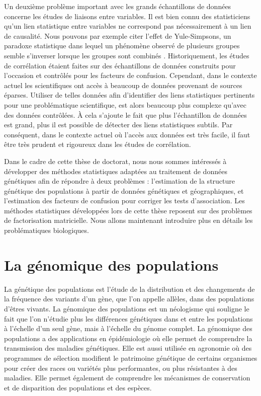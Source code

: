 \documentclass[12pt,a4paper,twoside]{ugathesis}
\begin{document}
Un deuxième problème important avec les grands échantillons de données concerne
les études de liaisons entre variables. Il est bien connu des statisticiens
qu'un lien statistique entre variables ne correspond pas nécessairement à un
lien de causalité. Nous pouvons par exemple citer l'effet de Yule-Simpsons, un
paradoxe statistique dans lequel un phénomène observé de plusieurs groupes
semble s'inverser lorsque les groupes sont combinés
\citep{simpson1951interpretation}. Historiquement, les études de corrélation
étaient faites sur des échantillons de données construits pour l'occasion et
contrôlés pour les facteurs de confusion. Cependant, dans le contexte actuel les
scientifiques ont accès à beaucoup de données provenant de sources éparses.
Utiliser de telles données afin d'identifier des liens statistiques pertinents
pour une problématique scientifique, est alors beaucoup plus complexe qu'avec
des données contrôlées. À cela s'ajoute le fait que plus l'échantillon de
données est grand, plus il est possible de détecter des liens statistiques
subtils. Par conséquent, dans le contexte actuel où l'accès aux données est très
facile, il faut être très prudent et rigoureux dans les études de corrélation.

Dans le cadre de cette thèse de doctorat, nous nous sommes intéressés à
développer des méthodes statistiques adaptées au traitement de données
génétiques afin de répondre à deux problèmes : l'estimation de la structure
génétique des populations à partir de données génétiques et géographiques, et
l'estimation des facteurs de confusion pour corriger les tests d'association.
Les méthodes statistiques développées lors de cette thèse reposent sur des
problèmes de factorisation matricielle. Nous allons maintenant introduire plus
en détails les problématiques biologiques.

\section{La génomique des populations}
\label{sec:org29625ec}
\label{orgb9e7d80}

La génétique des populations est l'étude de la distribution et des changements
de la fréquence des variants d'un gène, que l'on appelle allèles, dans des
populations d'êtres vivants. La génomique des populations est un néologisme qui
souligne le fait que l'on n'étudie plus les différences génétiques dans et entre
les populations à l'échelle d'un seul gène, mais à l'échelle du génome complet.
La génomique des populations a des applications en épidémiologie où elle permet
de comprendre la transmission des maladies génétiques. Elle est aussi utilisée
en agronomie où des programmes de sélection modifient le patrimoine génétique de
certains organismes pour créer des races ou variétés plus performantes, ou plus
résistantes à des maladies. Elle permet également de comprendre les mécanismes
de conservation et de disparition des populations et des espèces.
\end{document}
